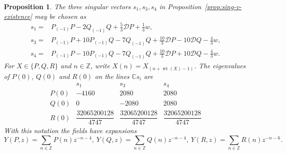 \documentclass[11pt]{amsart}
\numberwithin{equation}{section}
\newtheorem{proposition}[theorem]{Proposition}
\theoremstyle{definition}
\theoremstyle{remark}
\newcommand{\CC}{\mathbb C}
\newcommand{\ZZ}{\mathbb Z}
\newcommand{\wt}{\operatorname{wt}}
\begin{document}
\begin{proposition}\label{prop:explicit-singular-vectors}
The three singular vectors $s_1,s_3,s_4$ in
Proposition~\ref{prop:sing-v-existence} may be chosen as
\begin{equation}
\begin{aligned}
 s_1={}&P_{(-1)}P-2Q_{(-1)}Q
       +\frac53\mathcal D P+\frac13w,\\
 s_3={}&P_{(-1)}P+10P_{(-1)}Q-7Q_{(-1)}Q
       +\frac{10}{3}\mathcal D P-10\mathcal D Q-\frac43w,\\
 s_4={}&P_{(-1)}P-10P_{(-1)}Q-7Q_{(-1)}Q
       +\frac{10}{3}\mathcal D P+10\mathcal D Q-\frac43w.
\end{aligned}
\end{equation}
For $X\in\{P,Q,R\}$ and $n\in\ZZ$, write $X(n)=X_{(n+\wt(X)-1)}$.
The eigenvalues of $P(0)$, $Q(0)$ and $R(0)$ on the lines $\CC s_i$ are
	\begin{equation}\label{eq:eigenvalues}
		\begin{array}{c|ccc}
			&s_1&s_3&s_4\\ \hline
			P(0)&-4160&2080&2080\\
			Q(0)&0&-2080&2080\\
			R(0)&\dfrac{32065200128}{4747}&
			\dfrac{32065200128}{4747}&\dfrac{32065200128}{4747}
		\end{array}
	\end{equation}
With this notation the fields have expansions
	\[
 Y(P,z)=\sum_{n\in\ZZ}P(n)z^{-n-4},\ 
 Y(Q,z)=\sum_{n\in\ZZ}Q(n)z^{-n-4}, \ 
	Y(R,z)=\sum_{n\in\ZZ}R(n)z^{-n-6}.\]
\end{proposition}
\end{document}
